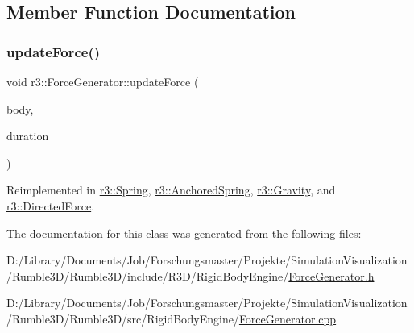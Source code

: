 \subsection{Member Function Documentation}
\mbox{\label{classr3_1_1_force_generator_a16d1e8aa85d574013de859b95944c5bb}} 
\subsubsection{\texorpdfstring{update\+Force()}{updateForce()}}
{\footnotesize\ttfamily void r3\+::\+Force\+Generator\+::update\+Force (\begin{DoxyParamCaption}\item[{\mbox{\hyperlink{classr3_1_1_rigid_body}{Rigid\+Body}} $\ast$}]{body,  }\item[{\mbox{\hyperlink{namespacer3_ab2016b3e3f743fb735afce242f0dc1eb}{real}}}]{duration }\end{DoxyParamCaption})\hspace{0.3cm}{\ttfamily [virtual]}}



Reimplemented in \mbox{\hyperlink{classr3_1_1_spring_a3305adfd568606ed9ae6fb589f20446b}{r3\+::\+Spring}}, \mbox{\hyperlink{classr3_1_1_anchored_spring_a3e928bc7fdedc8eb5b302a007200a58c}{r3\+::\+Anchored\+Spring}}, \mbox{\hyperlink{classr3_1_1_gravity_ae3152c6a922ffa193aee362e161cd4a9}{r3\+::\+Gravity}}, and \mbox{\hyperlink{classr3_1_1_directed_force_ac723ddeef767956d16fb9d0a1d706bfd}{r3\+::\+Directed\+Force}}.



The documentation for this class was generated from the following files\+:\begin{DoxyCompactItemize}
\item 
D\+:/\+Library/\+Documents/\+Job/\+Forschungsmaster/\+Projekte/\+Simulation\+Visualization/\+Rumble3\+D/\+Rumble3\+D/include/\+R3\+D/\+Rigid\+Body\+Engine/\mbox{\hyperlink{_force_generator_8h}{Force\+Generator.\+h}}\item 
D\+:/\+Library/\+Documents/\+Job/\+Forschungsmaster/\+Projekte/\+Simulation\+Visualization/\+Rumble3\+D/\+Rumble3\+D/src/\+Rigid\+Body\+Engine/\mbox{\hyperlink{_force_generator_8cpp}{Force\+Generator.\+cpp}}\end{DoxyCompactItemize}
